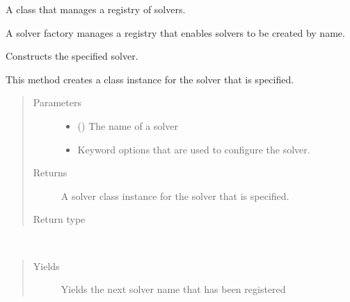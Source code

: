 \documentclass[letterpaper,10pt,english]{sphinxmanual}
\begin{document}
\begin{fulllineitems}
\label{\detokenize{reference/solverapi:pao.common.solver.SolverFactory}}
A class that manages a registry of solvers.

A solver factory manages a registry that enables
solvers to be created by name.

\begin{fulllineitems}
\label{\detokenize{reference/solverapi:pao.common.solver.SolverFactory.__call__}}
Constructs the specified solver.

This method creates a class instance for the solver that is specified.
\begin{quote}\begin{description}
\item[{Parameters}] \leavevmode\begin{itemize}
\item {} 
 () \textendash{} The name of a solver

\item {} 
 \textendash{} Keyword options that are used to configure the solver.

\end{itemize}

\item[{Returns}] \leavevmode
A solver class instance for the solver that is specified.

\item[{Return type}] \leavevmode
{\hyperref[\detokenize{reference/solverapi:pao.common.solver.SolverAPI}]{}}

\end{description}\end{quote}

\end{fulllineitems}


\begin{fulllineitems}
\label{\detokenize{reference/solverapi:pao.common.solver.SolverFactory.__iter__}}~\begin{quote}\begin{description}
\item[{Yields}] \leavevmode
{} \textendash{} Yields the next solver name that has been registered


\end{description}
\end{quote}
\end{fulllineitems}
\end{fulllineitems}
\end{document}
